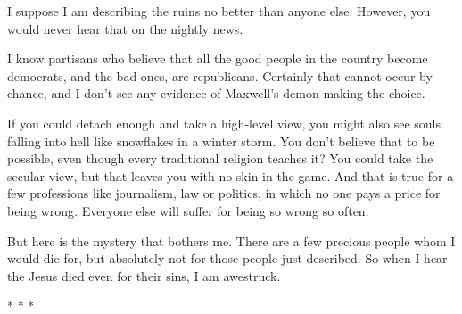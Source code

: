 I suppose I am describing the ruins no better than anyone else. However, you would never hear that on the nightly news.

I know partisans who believe that all the good people in the country become democrats, and the bad ones, are republicans. Certainly that cannot occur by chance, and I don't see any evidence of Maxwell's demon making the choice.

If you could detach enough and take a high-level view, you might also see souls falling into hell like snowflakes in a winter storm. You don't believe that to be possible, even though every traditional religion teaches it? You could take the secular view, but that leaves you with no skin in the game. And that is true for a few professions like journalism, law or politics, in which no one pays a price for being wrong. Everyone else will suffer for being so wrong so often.

But here is the mystery that bothers me. There are a few precious people whom I would die for, but absolutely not for those people just described. So when I hear the Jesus died even for their sins, I am awestruck.




\begin{center}* * *\end{center}

